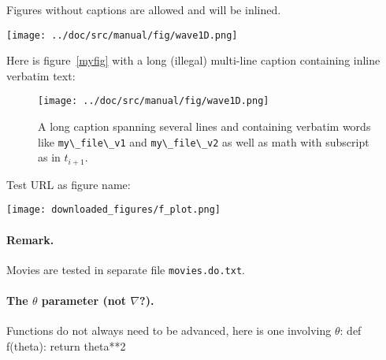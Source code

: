 \documentclass[%
oneside,                 %
final,                   %
10pt]{article}
\theoremstyle{definition}
\begin{document}
\begin{enumerate}
Figures without captions are allowed and will be inlined.

\vspace{6mm}

\centerline{\texttt{[image: ../doc/src/manual/fig/wave1D.png]}}

\vspace{6mm}



Here is figure~\vref{myfig} with a long (illegal) multi-line caption
containing inline verbatim text:

\begin{SCfigure}
  \centering
  \texttt{[image: ../doc/src/manual/fig/wave1D.png]}
  \caption{
  A long caption spanning several lines and containing verbatim words like \protect \Verb!my\_file\_v1! and \protect \Verb!my\_file\_v2! as well as math with subscript as in $t_{i+1}$. \label{myfig}
  }
\end{SCfigure}


Test URL as figure name:

\vspace{6mm}

\centerline{\texttt{[image: downloaded\_figures/f\_plot.png]}}

\vspace{6mm}


\paragraph{Remark.}
Movies are tested in separate file \texttt{movies.do.txt}.


\paragraph{The $\theta$ parameter (not $\nabla$?).}
\label{decay:sec:theta}

Functions do not always need to be advanced, here is one
involving $\theta$:
\bccq
def f(theta):
    return theta**2
\eccq


\end{enumerate}
\end{document}

